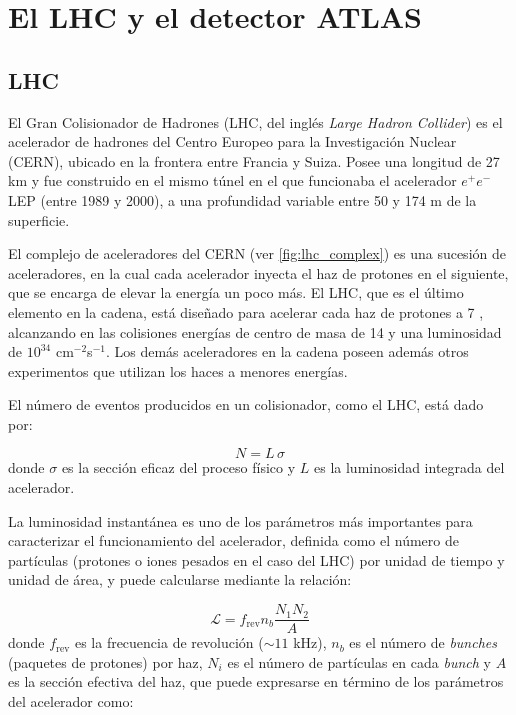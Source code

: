 \chapter{El LHC y el detector ATLAS}
\label{cap:detector}

\section{LHC}

El Gran Colisionador de Hadrones (LHC, del inglés \emph{Large Hadron Collider})
\cite{Evans:1129806} es el acelerador de hadrones del Centro Europeo para la
Investigación Nuclear (CERN), ubicado en la frontera entre Francia y Suiza.
Posee una longitud de 27 km y fue construido en el mismo túnel en el que
funcionaba el acelerador $e^{+}e^{-}$ LEP \cite{LEP} (entre 1989 y 2000), a una
profundidad variable entre 50 y 174 m de la superficie.

El complejo de aceleradores del CERN (ver \cref{fig:lhc_complex}) es una
sucesión de aceleradores, en la cual cada acelerador inyecta el haz de protones
en el siguiente, que se encarga de elevar la energía un poco más. El LHC, que es
el último elemento en la cadena, está diseñado para acelerar cada haz de
protones a 7 \tev, alcanzando en las colisiones energías de centro de masa de
14 \tev y una luminosidad de $10^{34}$ cm$^{-2}$s$^{-1}$. Los demás
aceleradores en la cadena poseen además otros experimentos que utilizan los
haces a menores energías.

El número de eventos producidos en un colisionador, como el LHC, está dado
por:

\begin{equation}
  N = L \, \sigma
\end{equation}
%
donde $\sigma$ es la sección eficaz del proceso físico y $L$ es la luminosidad integrada del
acelerador.

La luminosidad instantánea es uno de los parámetros más importantes para
caracterizar el funcionamiento del acelerador, definida como el número de
partículas (protones o iones pesados en el caso del LHC) por unidad de tiempo y unidad de
área, y puede calcularse mediante la relación:

\begin{equation}
  \mathcal{L} = f_\text{rev} n_b \frac{N_1 N_2}{A}
\end{equation}
%
donde $f_\text{rev}$ es la frecuencia de revolución ($\sim 11$ kHz), $n_b$ es el número de
\emph{bunches} (paquetes de protones) por haz, $N_i$ es el número de partículas
en cada \emph{bunch} y $A$ es la sección efectiva del haz, que puede expresarse en
término de los parámetros del acelerador como:

